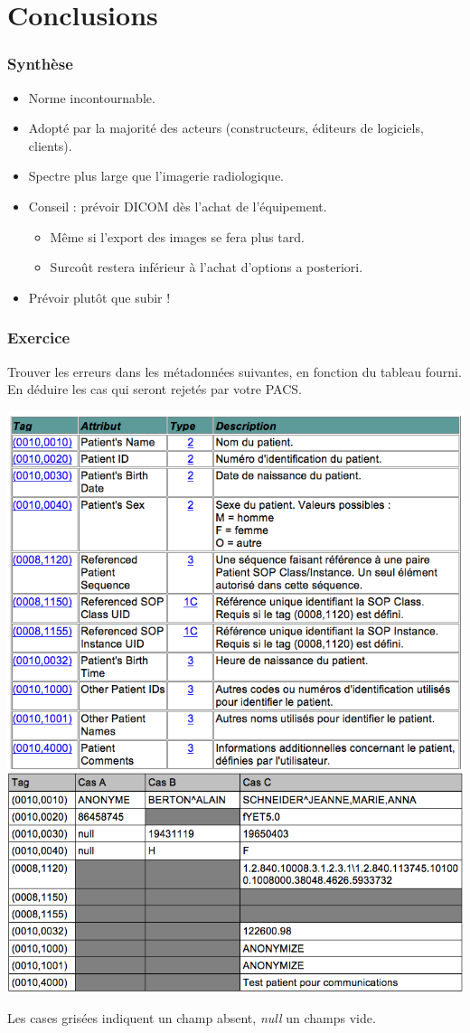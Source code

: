 \section{Conclusions}

\frame
{
	\frametitle{Synth\`ese}
	
	\begin{itemize}
		\item Norme incontournable.
		\item<2-> Adopt\'e par la majorit\'e des acteurs (constructeurs, \'editeurs de logiciels, clients).
		\item<3-> Spectre plus large que l'imagerie radiologique.
		\item<4-> Conseil : pr\'evoir DICOM d\`es l'achat de l'\'equipement.
		\begin{itemize}
			\item<5-> M\^eme si l'export des images se fera plus tard.
			\item<6-> Surco\^ut restera inf\'erieur \`a l'achat d'options a posteriori.
		\end{itemize}
		\item<7-> Pr\'evoir plut\^ot que subir !
	\end{itemize}
}

\frame
{
    \frametitle{Exercice}
    Trouver les erreurs dans les m\'etadonn\'ees suivantes, en fonction du tableau fourni.
    En d\'eduire les cas qui seront rejet\'es par votre PACS.

	\includegraphics[width=.5\linewidth]{./figures/table.png}
	\includegraphics[width=.5\linewidth]{./figures/metadata-cases.png}
    
    Les cases gris\'ees indiquent un champ absent, \emph{null} un champs vide.
}

